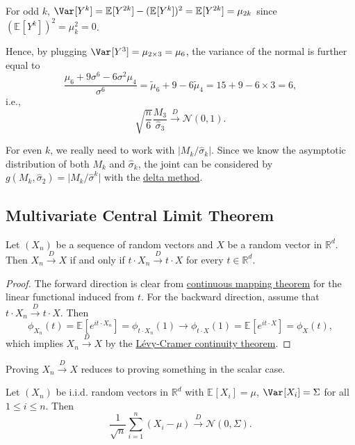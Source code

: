 \begin{note}
	For odd \(k\), \(\Var_{}[Y^k] = \mathbb{E}_{}[Y^{2k} ] - (\mathbb{E}_{}[Y^k] )^2 = \mathbb{E}_{}[Y^{2k} ] = \mu _{2k}\) since \((\mathbb{E}_{}[Y^k] )^2 = \mu _k^2 = 0\).
\end{note}

Hence, by plugging \(\Var_{}[Y^3] = \mu _{2 \times 3} = \mu _6\), the variance of the normal is further equal to
\[
	\frac{\mu _6 + 9 \sigma ^6 - 6 \sigma ^2 \mu _4}{\sigma ^6}
	= \widetilde{\mu} _6 + 9 - 6 \widetilde{\mu} _4
	= 15 + 9 - 6 \times 3
	= 6,
\]
i.e.,
\[
	\sqrt{\frac{n}{6}} \frac{M_3}{\hat{\sigma} _3}
	\overset{D}{\to} \mathcal{N} (0, 1).
\]

For even \(k\), we really need to work with \(\vert M_k / \hat{\sigma} _k \vert \). Since we know the asymptotic distribution of both \(M_k\) and \(\hat{\sigma} _k\), the joint can be considered by \(g(M_k , \hat{\sigma} _2) = \vert M_k / \hat{\sigma} ^k \vert \) with the \hyperref[thm:delta-method]{delta method}.

\subsection{Multivariate Central Limit Theorem}
\begin{theorem}\label{thm:Cramer-Wold-device}
	Let \((X_n)\) be a sequence of random vectors and \(X\) be a random vector in \(\mathbb{R} ^d\). Then \(X_n \overset{D}{\to} X\) if and only if \(t \cdot X_n \overset{D}{\to} t \cdot X\) for every \(t \in \mathbb{R} ^d\).
\end{theorem}
\begin{proof}
	The forward direction is clear from \hyperref[thm:continuous-mapping]{continuous mapping theorem} for the linear functional induced from \(t\). For the backward direction, assume that \(t \cdot X_n \overset{D}{\to} t \cdot X\). Then
	\[
		\phi _{X_n}(t)
		= \mathbb{E}_{}[e^{i t \cdot X_n}]
		= \phi _{t \cdot X_n}(1)
		\to \phi _{t \cdot X}(1)
		= \mathbb{E}_{}[e^{i t \cdot X}]
		= \phi _X(t),
	\]
	which implies \(X_n \overset{D}{\to} X\) by the \hyperref[thm:Levy-Cramer-continuity]{Lévy-Cramer continuity theorem}.
\end{proof}

\begin{remark}
	Proving \(X_n \overset{D}{\to} X\) reduces to proving something in the scalar case.
\end{remark}

\begin{theorem}\label{thm:multivariate-CLT}
	Let \((X_n)\) be i.i.d. random vectors in \(\mathbb{R} ^d\) with \(\mathbb{E}_{}[X_i] = \mu \), \(\Var_{}[X_i] = \Sigma \) for all \(1 \leq i \leq n\). Then
	\[
		\frac{1}{\sqrt{n} } \sum_{i=1}^{n} (X_i - \mu )
		\overset{D}{\to} \mathcal{N} (0, \Sigma ).
	\]
\end{theorem}